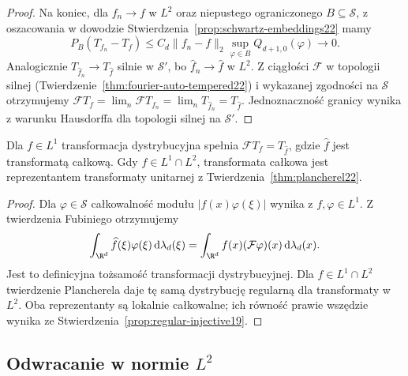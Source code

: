 \begin{proof}
Na koniec, dla $f_n\to f$ w $L^2$ oraz niepustego
ograniczonego $B\subseteq\mathcal S$, z oszacowania
w dowodzie Stwierdzenia~\ref{prop:schwartz-embeddings22} mamy
\[
 P_B(T_{f_n}-T_f)
 \le C_d\|f_n-f\|_2
 \sup_{\varphi\in B}Q_{d+1,0}(\varphi)\longrightarrow0.
\]
Analogicznie $T_{\widehat f_n}\to T_{\widehat f}$ silnie
w $\mathcal S'$, bo $\widehat f_n\to\widehat f$ w $L^2$.
Z ciągłości $\mathcal F$ w topologii silnej
(Twierdzenie~\ref{thm:fourier-auto-tempered22}) i
wykazanej zgodności na $\mathcal S$ otrzymujemy
$\mathcal FT_f=\lim_n\mathcal FT_{f_n}
=\lim_nT_{\widehat f_n}=T_{\widehat f}$.
Jednoznaczność granicy wynika z warunku Hausdorffa
dla topologii silnej na $\mathcal S'$.
\end{proof}

\begin{stwierdzenie}
\label{prop:dt-fourier-l1-l2-compat}
Dla $f\in L^1$ transformacja dystrybucyjna spełnia
$\mathcal FT_f=T_{\widehat f}$, gdzie $\widehat f$
jest transformatą całkową. Gdy $f\in L^1\cap L^2$,
transformata całkowa jest reprezentantem transformaty
unitarnej z Twierdzenia~\ref{thm:plancherel22}.
\end{stwierdzenie}
\begin{proof}
Dla $\varphi\in\mathcal S$ całkowalność modułu
$|f(x)\varphi(\xi)|$ wynika z $f,\varphi\in L^1$.
Z twierdzenia Fubiniego otrzymujemy
\[
 \int_{\R^d}\widehat f(\xi)\varphi(\xi)\,\mathrm d\lambda_d(\xi)
 =\int_{\R^d}f(x)(\mathcal F\varphi)(x)\,\mathrm d\lambda_d(x).
\]
Jest to definicyjna tożsamość transformacji dystrybucyjnej.
Dla $f\in L^1\cap L^2$ twierdzenie Plancherela daje
tę samą dystrybucję regularną dla transformaty w $L^2$.
Oba reprezentanty są lokalnie całkowalne; ich równość
prawie wszędzie wynika ze
Stwierdzenia~\ref{prop:regular-injective19}.
\end{proof}

\subsection{Odwracanie w normie \texorpdfstring{$L^2$}{L2}}

